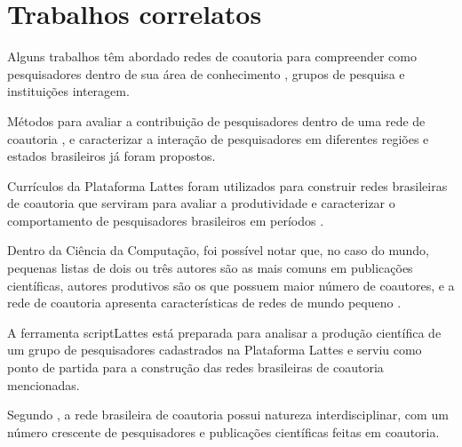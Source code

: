 \chapter[Trabalhos correlatos]{Trabalhos correlatos}

Alguns trabalhos têm abordado redes de coautoria para compreender como pesquisadores dentro de sua área de conhecimento \cite{mena2014brazilian} \cite{franceschet2011collaboration} \cite{santin2016collaboration}, grupos de pesquisa \cite{delgado2014analyzing} e instituições \cite{ioannidis2008measuring} interagem.

Métodos para avaliar a contribuição de pesquisadores dentro de uma rede de coautoria \cite{franceschet2011collaboration} \cite{liu2005co}, e caracterizar a interação de pesquisadores em diferentes regiões e estados brasileiros \cite{sidone2016ciencia} já foram propostos.

Currículos da Plataforma Lattes foram utilizados para construir redes brasileiras de coautoria que serviram para avaliar a produtividade e caracterizar o comportamento de pesquisadores brasileiros em períodos \cite{mena2014brazilian}.

Dentro da Ciência da Computação, foi possível notar que, no caso do mundo, pequenas listas de dois ou três autores são as mais comuns em publicações científicas, autores produtivos são os que possuem maior número de coautores, e a rede de coautoria apresenta características de redes de mundo pequeno \cite{franceschet2011collaboration}.

A ferramenta scriptLattes \cite{mena2009scriptlattes} está preparada para analisar a produção científica de um grupo de pesquisadores cadastrados na Plataforma Lattes \cite{mena2013prospecccao} e serviu como ponto de partida para a construção das redes brasileiras de coautoria mencionadas.

Segundo , a rede brasileira de coautoria possui natureza interdisciplinar, com um número crescente de pesquisadores e publicações científicas feitas em coautoria.
